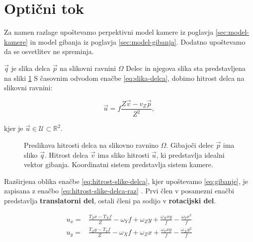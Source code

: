 \section{Optični tok} \label{sec:opticni-tok}
Za namen razlage upoštevamo perpektivni model kamere iz poglavja \ref{sec:model-kamere} in model gibanja iz poglavja \ref{sec:model-gibanja}. Dodatno upoštevamo da se osvetlitev ne spreminja.

$\vec{q}$ je slika delca $\vec{p}$ na slikovni ravnini $\mathit{\Omega}$ Delec in njegova slika sta predstavljena na sliki \ref{fig:optical-flow} S časovnim odvodom enačbe \eqref{eq:slika-delca}, dobimo hitrost delca na slikovni ravnini:

\begin{equation}\label{eq:hitrost-slike-delca}
	\vec{u} = f \frac{Z\vec{v}-v_Z\vec{p}}{Z^2},
\end{equation}

kjer je $\vec{u} \in \mathcal{U} \subset \mathbb{R}^2$.




\begin{figure}
\centering

\caption[Preslikava hitrosti delca na slikovno ravnino $\mathit{\Omega}$]{ Preslikava hitrosti delca na slikovno ravnino $\mathit{\Omega}$. Gibajoči delec $\vec{p}$ ima sliko $\vec{q}$. Hitrost delca $\vec{v}$ ima sliko hitrosti $\vec{u}$, ki predstavlja idealni vektor gibanja. Koordinatni sistem predstavlja sistem kamere.}
\label{fig:optical-flow}
\end{figure}




Razširjena oblika enačbe \eqref{eq:hitrost-slike-delca}, kjer upoštevamo \eqref{eq:gibanje}, je zapisana z enačbo \eqref{eq:hitrost-slike-delca-raz} \cite{trucco1998introductory}. Prvi člen v posamezni enačbi predstavlja \textbf{translatorni del}, ostali členi pa sodijo v \textbf{rotacijski del}.

\begin{equation}\label{eq:hitrost-slike-delca-raz}
\begin{aligned}
	u_x = & \frac{T_Z x - T_X f}{Z} - \omega_Y f + \omega_Z y + \frac{\omega_X x y}{f} - \frac{\omega_Y x^2}{f} \\
    u_y = & \frac{T_Z y - T_Y f}{Z} - \omega_X f + \omega_Z x + \frac{\omega_Y x y}{f} - \frac{\omega_X y^2}{f}
\end{aligned}
\end{equation}

